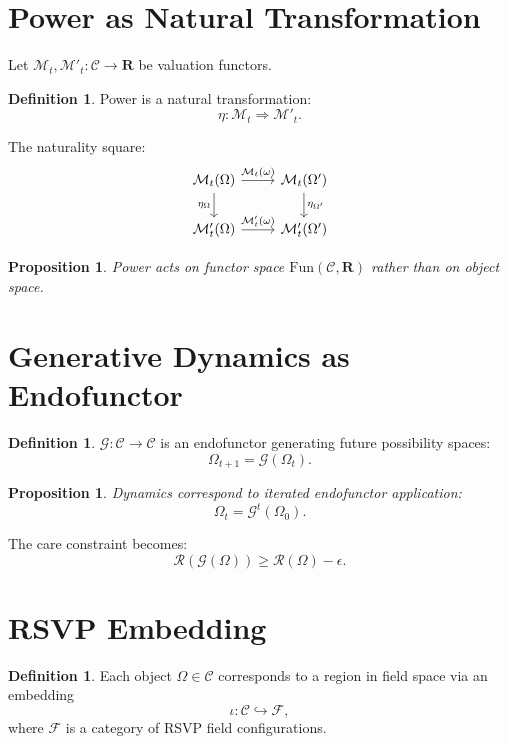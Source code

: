 \documentclass[11pt,a4paper]{article}
\newtheorem{proposition}[theorem]{Proposition}
\theoremstyle{definition}
\newtheorem{definition}[theorem]{Definition}
\theoremstyle{remark}
\begin{document}
\section{Power as Natural Transformation}

Let $\mathcal{M}_t, \mathcal{M}'_t : \mathcal{C} \to \mathbf{R}$ be valuation functors.

\begin{definition}
Power is a natural transformation:
\[
\eta : \mathcal{M}_t \Rightarrow \mathcal{M}'_t.
\]
\end{definition}

The naturality square:
\[
\begin{tikzcd}
\mathcal{M}_t(\Omega) \arrow[r, "\mathcal{M}_t(\omega)"] \arrow[d, "\eta_\Omega"'] & \mathcal{M}_t(\Omega') \arrow[d, "\eta_{\Omega'}"] \\
\mathcal{M}'_t(\Omega) \arrow[r, "\mathcal{M}'_t(\omega)"] & \mathcal{M}'_t(\Omega')
\end{tikzcd}
\]

\begin{proposition}
Power acts on functor space $\mathrm{Fun}(\mathcal{C}, \mathbf{R})$ rather than on object space.
\end{proposition}

\section{Generative Dynamics as Endofunctor}

\begin{definition}
$\mathcal{G} : \mathcal{C} \to \mathcal{C}$ is an endofunctor generating future possibility spaces:
\[
\Omega_{t+1} = \mathcal{G}(\Omega_t).
\]
\end{definition}

\begin{proposition}
Dynamics correspond to iterated endofunctor application:
\[
\Omega_t = \mathcal{G}^t(\Omega_0).
\]
\end{proposition}

The care constraint becomes:
\[
\mathcal{R}(\mathcal{G}(\Omega)) \geq \mathcal{R}(\Omega) - \epsilon.
\]

\section{RSVP Embedding}

\begin{definition}
Each object $\Omega \in \mathcal{C}$ corresponds to a region in field space via an embedding
\[
\iota : \mathcal{C} \hookrightarrow \mathcal{F},
\]
where $\mathcal{F}$ is a category of RSVP field configurations.
\end{definition}
\end{document}
